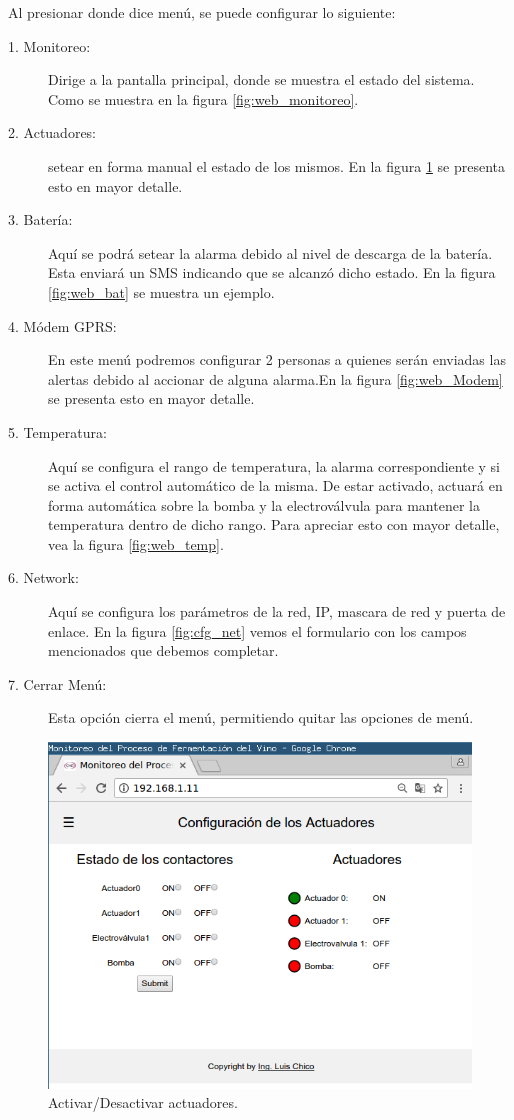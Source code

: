 Al presionar donde dice menú, se puede configurar lo siguiente:
\begin{description}
  \item[1. Monitoreo:] Dirige a la pantalla principal, donde se muestra el estado del sistema. Como se muestra en la figura \ref{fig:web_monitoreo}.
  \item[2. Actuadores:] setear en forma manual el estado de los mismos. En la figura \ref{fig:web_act} se presenta esto en mayor detalle.
  \item[3. Batería:] Aquí se podrá setear la alarma debido al nivel de descarga de la batería. Esta enviará un SMS indicando que se alcanzó dicho estado. En la figura \ref{fig:web_bat} se muestra un ejemplo.
  \item[4. Módem GPRS:] En este menú podremos configurar 2 personas a quienes serán enviadas las alertas debido al accionar de alguna alarma.En la figura \ref{fig:web_Modem} se presenta esto en mayor detalle.
  \item[5. Temperatura:] Aquí se configura el rango de temperatura, la alarma correspondiente y si se activa el control automático de la misma. De estar activado, actuará en forma automática sobre la bomba y la electroválvula para mantener la temperatura dentro de dicho rango. Para apreciar esto con mayor detalle, vea la figura \ref{fig:web_temp}.
  \item[6. Network:] Aquí se configura los parámetros de la red, IP, mascara de red y puerta de enlace. En la figura \ref{fig:cfg_net} vemos el formulario con los campos mencionados que debemos completar.
  \item[7. Cerrar Menú:] Esta opción cierra el menú, permitiendo quitar las opciones de menú.
\end{description}

\begin{figure}[h]
  \centering
  \includegraphics[scale=.35]{./Figures/config_act.png}
  \caption{ Activar/Desactivar actuadores.}
  \label{fig:web_act}
\end{figure}

